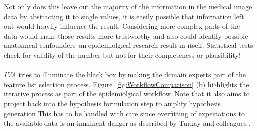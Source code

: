 \documentclass[journal]{style/vgtc} 			          %
\begin{document}
%
Not only does this leave out the majority of the information in the medical image data by abstracting it to single values, it is easily possible that information left out would heavily influence the result.
%
Considering more complex parts of the data would make those results more trustworthy and also could identify possible anatomical confounders--an epidemiolgical research result in itself.
%
Statistical tests check for validity of the number but not for their completeness or plausibility!
\\\\
\emph{IVA} tries to illuminate the black box by making the domain experts part of the feature list selection process.
%
Figure~\ref{fig:WorkflowComparison} (b) highlights the iterative process as part of the epidemiolgical workflow.
%
Note that it also aims to project back into the hypothesis formulation step to amplify hypothesis generation 
%
This has to be handled with care since overfitting of expectations to the available data is an imminent danger as described by Turkay and colleagues \cite{Turkay2013}.
\end{document}
